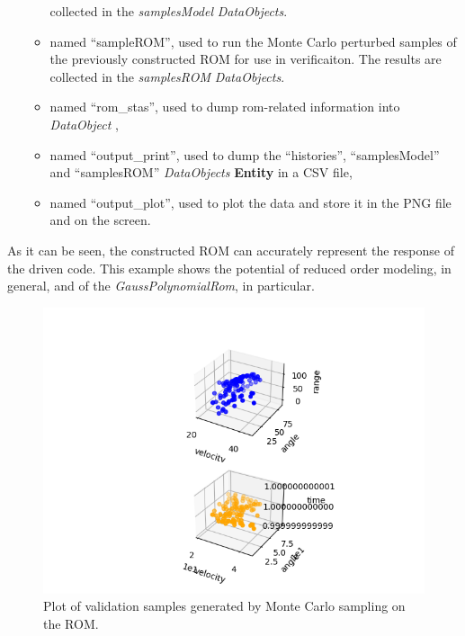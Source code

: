 \begin{enumerate}
\begin{itemize}
     collected in the \textit{samplesModel} \textit{DataObjects}.
     \item {} named ``sampleROM'', used to run the
     Monte Carlo perturbed samples of the previously constructed ROM for use in verificaiton.  The results are
     collected in the \textit{samplesROM} \textit{DataObjects}.
     \item {} named ``rom\_stas'', used to dump rom-related information into \textit{DataObject },
     \item  {} named ``output\_print'', used to dump
     the ``histories'', ``samplesModel'' and ``samplesROM'' \textit{DataObjects}
     \textbf{Entity} in a CSV file,
     \item  {} named ``output\_plot'', used to
     plot the data and store it in the PNG file and
     on the screen.
   \end{itemize}
\end{enumerate}
 As it can be seen, the constructed ROM can accurately
 represent the response of the driven code. This example shows the
 potential of reduced order modeling, in general, and of the
 \textit{GaussPolynomialRom}, in particular.

 \begin{figure}[h!]
  \centering
  \includegraphics[scale=0.7]{../../tests/framework/user_guide/ForwardSamplingStrategies/gold/RunDir/SparseGrid/1-samplesROMPlot3D_scatter-scatter.png}
  \caption{Plot of validation samples generated by Monte Carlo sampling on the ROM.}
  \label{fig:samplesROMSparseGridPlot}
 \end{figure}








